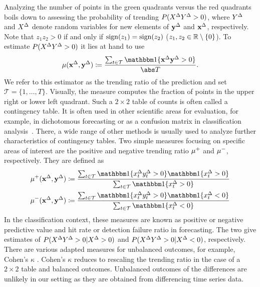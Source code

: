 Analyzing the number of points in the green quadrants versus the red quadrants boils down to assessing the probability of trending $P(X^{\Delta} Y^{\Delta} > 0)$, where $Y^{\Delta}$ and $X^{\Delta}$ denote random variables for new elements of $\mathbf{y}^{\Delta}$ and $\mathbf{x}^{\Delta}$, respectively. 
Note that $z_1 z_2 > 0$ if and only if $\operatorname{sign}(z_1) = \operatorname{sign}(z_2)$ ($z_1, z_2 \in \mathbb{R} \setminus \{ 0 \}$).
To estimate $P(X^{\Delta} Y^{\Delta} > 0)$ it lies at hand to use
\begin{equation}
    \acc (\diffx, \diffy) \coloneqq \frac{\sum_{t \in \mathcal{T}} \ind{\diffx \diffy > 0}}{\card{T}}.\label{eq:acc}
\end{equation}
We refer to this estimator as the trending ratio of the prediction and set $\mathcal{T} = \{1, \dots, T\}$.
Visually, the measure computes the fraction of points in the upper right or lower left quadrant.
Such a $2 \times 2$ table of counts is often called a contingency table. It is often used in other scientific areas for evaluation, for example, in dichotomous forecasting or as a confusion matrix in classification analysis~\parencites(see, e.g., the introductions in)()[Ch. 4]{James2021}[Ch. 3]{Jolliffe2012}.
There, a wide range of other methods is usually used to analyze further characteristics of contingency tables.
Two simple measures focusing on specific areas of interest are the positive and negative trending ratio $\mu^+$ and $\mu^-$, respectively.
They are defined as
\begin{align}
    \accp (\diffx, \diffy) &\coloneqq \frac{\sum_{t \in \mathcal{T}} \ind{\diffxt \diffyt > 0} \ind{\diffxt > 0}}{\sum_{t \in \mathcal{T}} \ind{\diffxt > 0}} \label{eq:accp}\\
    \accm (\diffx, \diffy) &\coloneqq \frac{\sum_{t \in \mathcal{T}} \ind{\diffxt \diffyt > 0} \ind{\diffxt < 0}}{\sum_{t \in \mathcal{T}} \ind{\diffxt < 0}}\label{eq:accm}
\end{align}
In the classification context, these measures are known as positive or negative predictive value and hit rate or detection failure ratio in forecasting.
The two give estimates of $P(X^{\Delta} Y^{\Delta} > 0 | X^{\Delta} > 0)$ and $P(X^{\Delta} Y^{\Delta} > 0 | X^{\Delta} < 0)$, respectively.
There are various adapted measures for unbalanced outcomes, for example, Cohen's $\kappa$ .
Cohen's $\kappa$ reduces to rescaling the trending ratio in the case of a $2\times2$ table and balanced outcomes.
Unbalanced outcomes of the differences are unlikely in our setting as they are obtained from differencing time series data.
